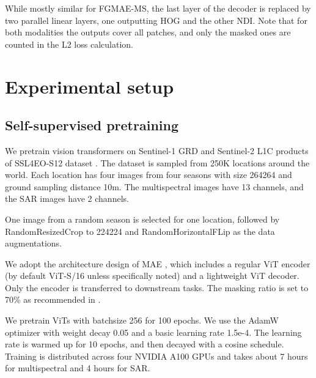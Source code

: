 \documentclass[lettersize,journal]{IEEEtran}
\begin{document}
While mostly similar for FGMAE-MS, the last layer of the decoder is replaced by two parallel linear layers, one outputting HOG and the other NDI. Note that for both modalities the outputs cover all patches, and only the masked ones are counted in the L2 loss calculation.





\section{Experimental setup}

\subsection{Self-supervised pretraining}

\hspace{0.3em}
We pretrain vision transformers on Sentinel-1 GRD and Sentinel-2 L1C products of SSL4EO-S12 dataset \cite{wang2023ssl4eo}. The dataset is sampled from 250K locations around the world. Each location has four images from four seasons with size 264264 and ground sampling distance 10m. The multispectral images have 13 channels, and the SAR images have 2 channels.

\vspace{0.5em}
\hspace{0.3em}
One image from a random season is selected for one location, followed by RandomResizedCrop to 224224 and RandomHorizontalFLip as the data augmentations.

\vspace{0.5em}
\hspace{0.3em}
We adopt the architecture design of MAE \cite{he2022masked}, which includes a regular ViT encoder (by default ViT-S/16 unless specifically noted) and a lightweight ViT decoder. Only the encoder is transferred to downstream tasks. The masking ratio is set to 70\% as recommended in \cite{wang2023ssl4eo}.

\vspace{0.5em}
\hspace{0.3em}
We pretrain ViTs with batchsize 256 for 100 epochs. We use the AdamW optimizer \cite{loshchilov2018decoupled} with weight decay 0.05 and a basic learning rate 1.5e-4. The learning rate is warmed up for 10 epochs, and then decayed with a cosine schedule. Training is distributed across four NVIDIA A100 GPUs and takes about 7 hours for multispectral and 4 hours for SAR. 
\end{document}
